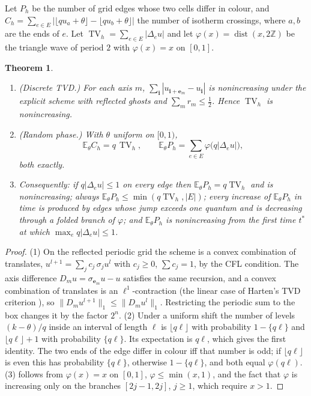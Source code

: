 \documentclass[11pt,a4paper]{article}
\newtheorem{theorem}{Theorem}[section]
\theoremstyle{definition}
\theoremstyle{remark}
\newcommand{\Z}{\mathbb{Z}}
\newcommand{\E}{\mathbb{E}}
\newcommand{\TV}{\operatorname{TV}}
\DeclareMathOperator{\dist}{dist}
\begin{document}
Let $P_h$ be the number of grid edges whose two cells differ in colour,
and $C_h=\sum_{e\in E}|\lfloor qu_a+\theta\rfloor-\lfloor qu_b+\theta\rfloor|$
the number of isotherm crossings, where $a,b$ are the ends of $e$. Let
$\TV_h=\sum_{e\in E}|\Delta_eu|$ and let $\varphi(x)=\dist(x,2\Z)$ be the
triangle wave of period $2$ with $\varphi(x)=x$ on $[0,1]$.

\begin{theorem}\label{thm:grid}
\begin{enumerate}
\item (Discrete TVD.) For each axis $m$, $\sum_{\mathbf i}|u_{\mathbf i+\mathbf e_m}-u_{\mathbf i}|$ is nonincreasing under the explicit scheme with reflected ghosts and $\sum_mr_m\le\frac12$. Hence $\TV_h$ is nonincreasing.
\item (Random phase.) With $\theta$ uniform on $[0,1)$,
\begin{equation}\label{eq:phase}
  \E_\theta C_h=q\,\TV_h,\qquad
  \E_\theta P_h=\sum_{e\in E}\varphi\bigl(q|\Delta_eu|\bigr),
\end{equation}
both exactly.
\item Consequently: if $q|\Delta_eu|\le1$ on every edge then $\E_\theta P_h=q\TV_h$ and is nonincreasing; always $\E_\theta P_h\le\min(q\TV_h,|E|)$; every increase of $\E_\theta P_h$ in time is produced by edges whose jump exceeds one quantum and is decreasing through a folded branch of $\varphi$; and $\E_\theta P_h$ is nonincreasing from the first time $t^\ast$ at which $\max_e q|\Delta_eu|\le1$.
\end{enumerate}
\end{theorem}

\begin{proof}
(1) On the reflected periodic grid the scheme is a convex combination of
translates, $u^{l+1}=\sum_jc_j\,\sigma_ju^l$ with $c_j\ge0$,
$\sum c_j=1$, by the CFL condition. The axis difference
$D_mu=\sigma_{\mathbf e_m}u-u$ satisfies the same recursion, and a
convex combination of translates is an $\ell^1$-contraction (the
linear case of Harten's TVD criterion \cite{Harten}), so
$\|D_mu^{l+1}\|_1\le\|D_mu^l\|_1$. Restricting the periodic sum to the
box changes it by the factor $2^n$. (2) Under a uniform shift the number
of levels $(k-\theta)/q$ inside an interval of length $\ell$ is
$\lfloor q\ell\rfloor$ with probability $1-\{q\ell\}$ and
$\lfloor q\ell\rfloor+1$ with probability $\{q\ell\}$. Its expectation is
$q\ell$, which gives the first identity. The two ends of the edge differ
in colour iff that number is odd; if $\lfloor q\ell\rfloor$ is even this
has probability $\{q\ell\}$, otherwise $1-\{q\ell\}$, and both equal
$\varphi(q\ell)$. (3) follows from $\varphi(x)=x$ on $[0,1]$,
$\varphi\le\min(x,1)$, and the fact that $\varphi$ is increasing only on
the branches $[2j-1,2j]$, $j\ge1$, which require $x>1$.
\end{proof}
\end{document}
